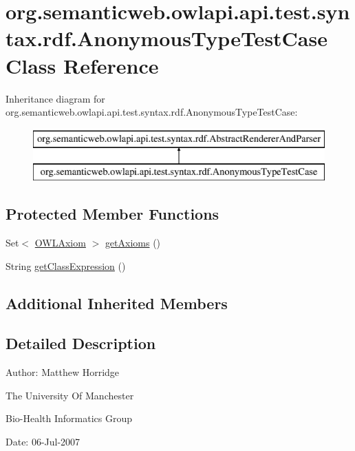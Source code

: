 \hypertarget{classorg_1_1semanticweb_1_1owlapi_1_1api_1_1test_1_1syntax_1_1rdf_1_1_anonymous_type_test_case}{\section{org.\-semanticweb.\-owlapi.\-api.\-test.\-syntax.\-rdf.\-Anonymous\-Type\-Test\-Case Class Reference}
\label{classorg_1_1semanticweb_1_1owlapi_1_1api_1_1test_1_1syntax_1_1rdf_1_1_anonymous_type_test_case}
}
Inheritance diagram for org.\-semanticweb.\-owlapi.\-api.\-test.\-syntax.\-rdf.\-Anonymous\-Type\-Test\-Case\-:\begin{figure}[H]
\begin{center}
\leavevmode
\includegraphics[height=2.000000cm]{classorg_1_1semanticweb_1_1owlapi_1_1api_1_1test_1_1syntax_1_1rdf_1_1_anonymous_type_test_case}
\end{center}
\end{figure}
\subsection*{Protected Member Functions}
\begin{DoxyCompactItemize}
\item 
Set$<$ \hyperlink{interfaceorg_1_1semanticweb_1_1owlapi_1_1model_1_1_o_w_l_axiom}{O\-W\-L\-Axiom} $>$ \hyperlink{classorg_1_1semanticweb_1_1owlapi_1_1api_1_1test_1_1syntax_1_1rdf_1_1_anonymous_type_test_case_afe3cb84cbb6af271c0449eff8764bb18}{get\-Axioms} ()
\item 
String \hyperlink{classorg_1_1semanticweb_1_1owlapi_1_1api_1_1test_1_1syntax_1_1rdf_1_1_anonymous_type_test_case_af6116b54bd1bc212a47960be72002dce}{get\-Class\-Expression} ()
\end{DoxyCompactItemize}
\subsection*{Additional Inherited Members}


\subsection{Detailed Description}
Author\-: Matthew Horridge\par
 The University Of Manchester\par
 Bio-\/\-Health Informatics Group\par
 Date\-: 06-\/\-Jul-\/2007\par
 \par
 

